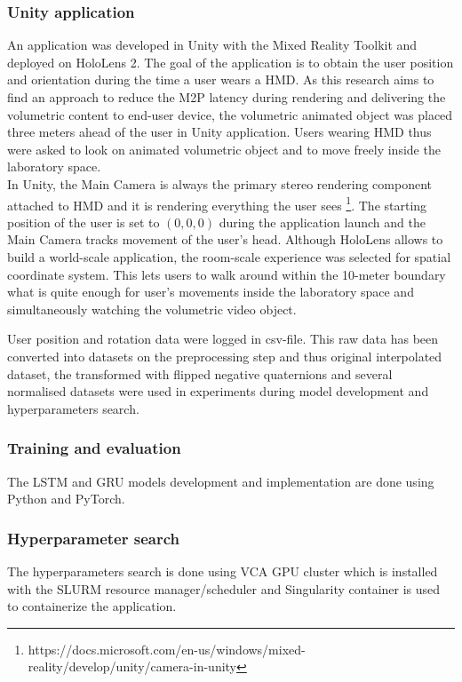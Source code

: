 \subsubsection{Unity application}
\label{sec:impl:model:dev:unity}
An application was developed in Unity with the Mixed Reality Toolkit and deployed on HoloLens 2. The goal of the application is to obtain the user position and orientation during the time a user wears a HMD. As this research aims to find an approach to reduce the M2P latency during rendering and delivering the volumetric content to end-user device, the volumetric animated object was placed three meters ahead of the user in Unity application. Users wearing HMD thus were asked to look on animated volumetric object and to move freely inside the laboratory space.\\
In Unity, the Main Camera is always the primary stereo rendering component attached to HMD and it is rendering everything the user sees \footnote{https://docs.microsoft.com/en-us/windows/mixed-reality/develop/unity/camera-in-unity}. The starting position of the user is set to $(0, 0, 0)$ during the application launch and the Main Camera tracks movement of the user's head. Although HoloLens allows to build a world-scale application, the room-scale experience was selected for spatial coordinate system. This lets users to walk around within the 10-meter boundary what is quite enough for user's movements inside the laboratory space and simultaneously watching the volumetric video object. 

User position and rotation data were logged in csv-file. This raw data has been converted into datasets on the preprocessing step and thus original interpolated dataset, the transformed with flipped negative quaternions and several normalised datasets were used in experiments during model development and hyperparameters search.


\subsubsection{Training and evaluation}
\label{sec:impl:model:dev:programming}
The LSTM and GRU models development and implementation are done using Python and PyTorch. 


\subsubsection{Hyperparameter search}
\label{sec:impl:model:dev:search}

The hyperparameters search is done using VCA GPU cluster which is installed with the SLURM resource manager/scheduler and Singularity container is used to containerize the application. 
